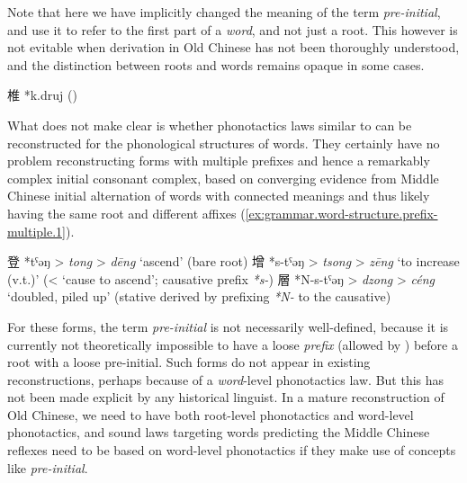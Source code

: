 \documentclass[UTF8, a4paper, oneside, scheme=plain, 12pt]{ctexrep}
\newcommand*{\citepage}[1]{p.~{#1}}
\newcommand*{\term}[1]{\emph{#1}}
\newcommand{\form}[1]{\emph{#1}}
\newcommand{\translate}[1]{`#1'}
\begin{document}
Note that here we have implicitly changed the meaning of the term \term{pre-initial},
and use it to refer to the first part of a \emph{word}, and not just a root.
This however is not evitable when derivation in Old Chinese has not been thoroughly understood,
and the distinction between roots and words remains opaque in some cases.

\begin{exe}
    \ex\label{ex:grammar.word-structure.dot.1} 椎 *k.druj \hfill (\citealt[\citepage{279}]{baxter2014old})
\end{exe}

What \citet{baxter2014old} does not make clear is whether phonotactics laws similar to  can be reconstructed for the phonological structures of words.
They certainly have no problem reconstructing forms with multiple prefixes and hence a remarkably complex initial consonant complex,
based on converging evidence from Middle Chinese initial alternation of words with connected meanings and thus likely having the same root and different affixes 
(\ref{ex:grammar.word-structure.prefix-multiple.1}).

\begin{exe}
    \ex\label{ex:grammar.word-structure.prefix-multiple.1} \citealt[\citepage{59}]{baxter2014old}
    \begin{xlist}
        \ex 登 *tˤəŋ > \form{tong} > \form{dēng} \translate{ascend} (bare root)
        \ex 增 *s-tˤəŋ > \form{tsong} > \form{zēng} \translate{to increase (v.t.)} (< \translate{cause to ascend}; causative prefix \form{*s-})
        \ex 層 *N-s-tˤəŋ > \form{dzong} > \form{céng} \translate{doubled, piled up} (stative derived by prefixing \form{*N-} to the causative)
    \end{xlist}
\end{exe}

For these forms, the term \term{pre-initial} is not necessarily well-defined,
because it is currently not theoretically impossible to have a loose \emph{prefix} (allowed by \citealt[\citepage{54}]{baxter2014old}) before a root with a loose pre-initial.
Such forms do not appear in existing reconstructions, perhaps because of a \emph{word}-level phonotactics law.
But this has not been made explicit by any historical linguist.
In a mature reconstruction of Old Chinese,
we need to have both root-level phonotactics and word-level phonotactics,
and sound laws targeting words predicting the Middle Chinese reflexes
need to be based on word-level phonotactics if they make use of concepts like \term{pre-initial}. 
\end{document}
